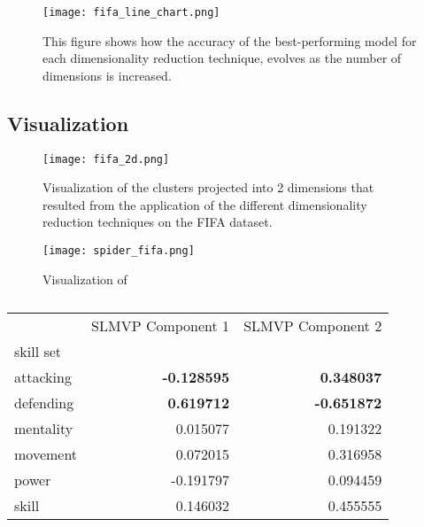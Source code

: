 \begin{figure}[!h]
    \centering
    \texttt{[image: fifa\_line\_chart.png]}
    \caption{This figure shows how the accuracy of the best-performing model for each dimensionality reduction technique, evolves as the number of dimensions is increased.}
    \label{fig:fifa_line_chart}
\end{figure}

\subsection{Visualization}

\begin{figure}[!h]
    \centering
    \texttt{[image: fifa\_2d.png]}
    \caption{Visualization of the clusters projected into 2 dimensions that resulted from the application of the different dimensionality reduction techniques on the FIFA dataset.}
    \label{fig:fifa_2d}
\end{figure}


\begin{figure}[!h]
    \centering
    \texttt{[image: spider\_fifa.png]}
    \caption{Visualization of }
    \label{fig:spider_fifa}
\end{figure}

\begin{table}[!h]
    \begin{tabular}{lrr}
        \toprule
        {}        & SLMVP Component 1  & SLMVP Component 2  \\
        skill set &                    &                    \\
        \midrule
        attacking & \textbf{-0.128595} & \textbf{0.348037}  \\
        defending & \textbf{0.619712}  & \textbf{-0.651872} \\
        mentality & 0.015077           & 0.191322           \\
        movement  & 0.072015           & 0.316958           \\
        power     & -0.191797          & 0.094459           \\
        skill     & 0.146032           & 0.455555           \\
        \bottomrule
    \end{tabular}
    \caption{}
    \label{tab:fifa-corr}
\end{table}

